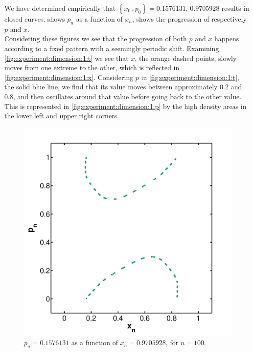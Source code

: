 We have determined empirically that $\left\{x_0\,, p_0 \right\} = {\num{0.1576131},\,\num{0.9705928}}$ results in closed curves.  shows $p_n$ as a function of $x_n$,  shows the progression of respectively $p$ and $x$.\\

Considering these figures we see that the progression of both $p$ and $x$ happens according to a fixed pattern with a seemingly periodic shift. Examining \cref{fig:experiment:dimension:1:t} we see that $x$, the orange dashed points, slowly moves from one extreme to the other, which is reflected in \cref{fig:experiment:dimension:1:x}. Considering $p$ in \cref{fig:experiment:dimension:1:t}, the solid blue line, we find that its value moves between approximately 0.2 and 0.8, and then oscillates around that value before going back to the other value. This is represented in \cref{fig:experiment:dimension:1:p} by the high density areas in the lower left and upper right corners.

\begin{figure}
	\centering
	\includegraphics[width=0.9\columnwidth]{./img/assignment_a_1_dim_n100}
	\caption{$p_n = \num{0.1576131}$ as a function of $x_n= \num{0.9705928}$, for $n = 100$.}
	\label{fig:experiment:a_1_n100}
\end{figure}



